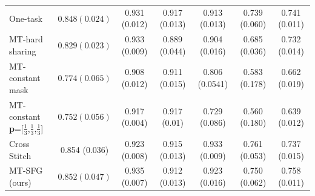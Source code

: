\begin{table}[t!]
\begin{subtable}[t]{1.0\linewidth}
\begin{center}
\begin{tabular}{l|c|ccccc}
                \midrule
                One-task \cite{wenqi} & $0.848 (0.024)$ & 0.931 (0.012)  & \cellcolor{blue!15} 0.917 (0.013)   & 0.913 (0.013) & 0.739 (0.060)  & 0.741 (0.011)  \\
                
                \multirow{1}{*}{MT-hard sharing }  & $0.829 (0.023)$ & \cellcolor{blue!15} 0.933 (0.009)  & 0.889 (0.044)    &  0.904 (0.016) & 0.685 (0.036)   &  0.732 (0.014) \\
               
                \multirow{1}{*}{MT-constant mask}  & $0.774 (0.065)$ & 0.908 (0.012)  & 0.911 (0.015)    &0.806 (0.0541)   & 0.583 (0.178)  & 0.662 (0.019) \\
                \multirow{1}{*}{MT-constant \textbf{p}=[$\frac{1}{3}$,$\frac{1}{3}$,$\frac{1}{3}$]}   & $0.752 (0.056)$ &   0.917 (0.004)& \cellcolor{red!15} 0.917 (0.01)&0.729 (0.086)   & 0.560 (0.180)  &0.639 (0.012)\\
                 \multirow{1}{*}{Cross Stitch \cite{MisraCrossMTL16}}  &\cellcolor{red!15}  0.854 (0.036) & 0.923 (0.008)   &  0.915 (0.013) &   \cellcolor{red!15} 0.933 (0.009)  &  \cellcolor{red!15} 0.761 (0.053)   &   \cellcolor{blue!15} 0.737 (0.015)\\
                 \multirow{1}{*}{MT-SFG (ours)}  &  \cellcolor{blue!15}  $0.852 (0.047)$ &  \cellcolor{red!15} 0.935 (0.007)  & 0.912 (0.013)   &  \cellcolor{blue!15} 0.923 (0.016)  &  \cellcolor{blue!15}  0.750 (0.062) &  \cellcolor{red!15} 0.758 (0.011) \\
        \hline
        \end{tabular}
        \end{center}
    \label{tab:seg}
    \end{subtable}


\end{table}
